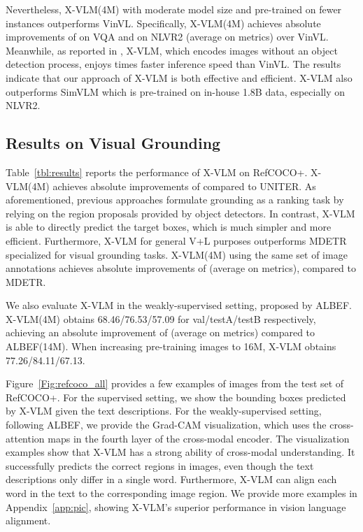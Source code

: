 \documentclass[nohyperref]{article}
\theoremstyle{plain}
\theoremstyle{definition}
\theoremstyle{remark}
\begin{document}
Nevertheless, X-VLM(4M) with moderate model size and pre-trained on fewer instances outperforms VinVL. Specifically, X-VLM(4M) achieves absolute improvements of  on VQA and  on NLVR2 (average on metrics) over VinVL. Meanwhile, as reported in \citet{li2021align}, X-VLM, which encodes images without an object detection process, enjoys  times faster inference speed than VinVL. The results indicate that our approach of X-VLM is both effective and efficient. X-VLM also outperforms SimVLM which is pre-trained on in-house 1.8B data, especially on NLVR2. 


\subsection{Results on Visual Grounding} 


Table~\ref{tbl:results} reports the performance of X-VLM on RefCOCO+. X-VLM(4M) achieves absolute improvements of  compared to UNITER. As aforementioned, previous approaches formulate grounding as a ranking task by relying on the region proposals provided by object detectors. In contrast, X-VLM is able to directly predict the target boxes, which is much simpler and more efficient. Furthermore, X-VLM for general V+L purposes outperforms MDETR~\cite{kamath2021mdetr} specialized for visual grounding tasks. X-VLM(4M) using the same set of image annotations achieves absolute improvements of  (average on metrics), compared to MDETR. 


We also evaluate X-VLM in the weakly-supervised setting, proposed by ALBEF. X-VLM(4M) obtains 68.46/76.53/57.09 for val/testA/testB respectively, achieving an absolute improvement of  (average on metrics) compared to ALBEF(14M). When increasing pre-training images to 16M, X-VLM obtains 77.26/84.11/67.13. 


Figure~\ref{Fig:refcoco_all} provides a few examples of images from the test set of RefCOCO+. For the supervised setting, we show the bounding boxes predicted by X-VLM given the text descriptions. For the weakly-supervised setting, following ALBEF, we provide the Grad-CAM visualization, which uses the cross-attention maps in the fourth layer of the cross-modal encoder. The visualization examples show that X-VLM has a strong ability of cross-modal understanding. It successfully predicts the correct regions in images, even though the text descriptions only differ in a single word. Furthermore, X-VLM can align each word in the text to the corresponding image region. We provide more examples in Appendix~\ref{app:pic}, showing X-VLM's superior performance in vision language alignment. 
\end{document}
